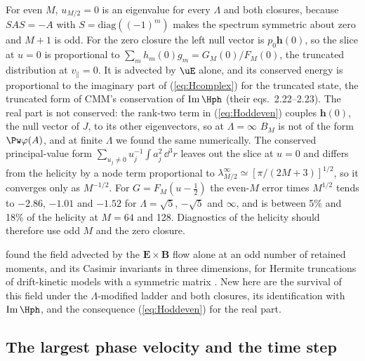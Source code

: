 For even $M$, $u_{M/2}=0$ is an eigenvalue for every $\Lambda$ and both closures, because $SAS=-A$ with $S=\mathrm{diag}((-1)^m)$ makes the spectrum symmetric about zero and $M+1$ is odd. For the zero closure the left null vector is $p_0\boldsymbol h(0)$, so the slice at $u=0$ is proportional to $\sum_mh_m(0)g_m=G_M(0)/F_M(0)$, the truncated distribution at $v_\parallel=0$. It is advected by $\uE$ alone, and its conserved energy is proportional to the imaginary part of (\ref{eq:Hcomplex}) for the truncated state, the truncated form of CMM's conservation of $\mathrm{Im}\,\Hph$ (their eqs.~2.22--2.23). The real part is not conserved: the rank-two term in (\ref{eq:Hoddeven}) couples $\boldsymbol h(0)$, the null vector of $J$, to its other eigenvectors, so at $\Lambda=\infty$ $B_M$ is not of the form $\Pw\varphi(A)$, and at finite $\Lambda$ we found the same numerically. The conserved principal-value form $\sum_{u_j\neq0}u_j^{-1}\int a_j^2\,\dd^3r$ leaves out the slice at $u=0$ and differs from the helicity by a node term proportional to $\lambda^\infty_{M/2}\simeq[\pi/(2M+3)]^{1/2}$, so it converges only as $M^{-1/2}$. For $G=F_M(u-\frac12)$ the even-$M$ error times $M^{1/2}$ tends to $-2.86$, $-1.01$ and $-1.52$ for $\Lambda=\sqrt5$, $-\sqrt5$ and $\infty$, and is between 5\% and 18\% of the helicity at $M=64$ and 128. Diagnostics of the helicity should therefore use odd $M$ and the zero closure.

\citet{Tassi2022} found the field advected by the $\boldsymbol E\times\boldsymbol B$ flow alone at an odd number of retained moments, and its Casimir invariants in three dimensions, for Hermite truncations of drift-kinetic models with a symmetric matrix \citep[see also][and \citealt{Tassi2015} in two dimensions]{Tassi2023}. New here are the survival of this field under the $\Lambda$-modified ladder and both closures, its identification with $\mathrm{Im}\,\Hph$, and the consequence (\ref{eq:Hoddeven}) for the real part.

\subsection{The largest phase velocity and the time step}

